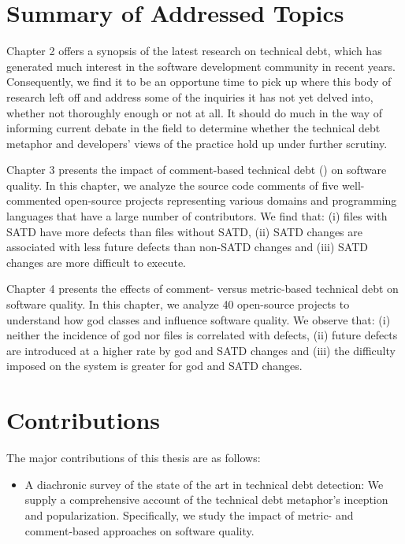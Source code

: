 
\section{Summary of Addressed Topics}


Chapter 2 offers a synopsis of the latest research on technical debt, which has generated much interest in the software development community in recent years. Consequently, we find it to be an opportune time to pick up where this body of research left off and address some of the inquiries it has not yet delved into, whether not thoroughly enough or not at all. It should do much in the way of informing current debate in the field to determine whether the technical debt metaphor and developers' views of the practice hold up under further scrutiny.

Chapter 3 presents the impact of comment-based technical debt (\SATD) on software quality. In this chapter, we analyze the source code comments of five well-commented open-source projects representing various domains and programming languages that have a large number of contributors. We find that: (i) files with SATD have more defects than files without SATD, (ii) SATD changes are associated with less future defects than non-SATD changes and (iii) SATD changes are more difficult to execute.

Chapter 4 presents the effects of comment- versus metric-based technical debt on software quality. In this chapter, we analyze 40 open-source projects to understand how god classes and \SATD influence software quality. We observe that: (i) neither the incidence of god nor \SATD files is correlated with defects, (ii) future defects are introduced at a higher rate by god and SATD changes and (iii) the difficulty imposed on the system is greater for god and SATD changes.

\section{Contributions}
The major contributions of this thesis are as follows:

\begin{itemize}
	\item A diachronic survey of the state of the art in technical debt detection: We supply a comprehensive account of the technical debt metaphor's inception and popularization. Specifically, we study the impact of metric- and comment-based approaches on software quality.
\end{itemize}
